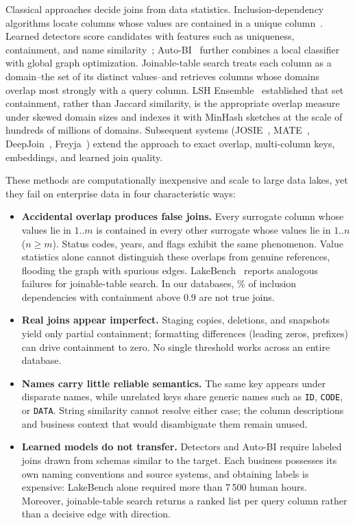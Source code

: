 Classical approaches decide joins from data statistics. Inclusion-dependency algorithms locate columns whose values are contained in a unique column~\cite{Tschirschnitz17}. Learned detectors score candidates with features such as uniqueness, containment, and name similarity~\cite{Rostin09,ZhangHOPS10,HoPF}; Auto-BI~\cite{AutoBI} further combines a local classifier with global graph optimization. Joinable-table search treats each column as a domain--the set of its distinct values--and retrieves columns whose domains overlap most strongly with a query column. LSH Ensemble~\cite{DBLP:journals/pvldb/ZhuNPM16} established that set containment, rather than Jaccard similarity, is the appropriate overlap measure under skewed domain sizes and indexes it with MinHash sketches at the scale of hundreds of millions of domains. Subsequent systems (JOSIE~\cite{DBLP:conf/sigmod/ZhuDNM19}, MATE~\cite{MATE}, DeepJoin~\cite{2023_dong_deepjoin}, Freyja~\cite{Freyja}) extend the approach to exact overlap, multi-column keys, embeddings, and learned join quality.

These methods are computationally inexpensive and scale to large data lakes, yet they fail on enterprise data in four characteristic ways:
\begin{itemize}[leftmargin=*]
\item \textbf{Accidental overlap produces false joins.} Every surrogate column whose values lie in $1..m$ is contained in every other surrogate whose values lie in $1..n$ ($n\geq m$). Status codes, years, and flags exhibit the same phenomenon. Value statistics alone cannot distinguish these overlaps from genuine references, flooding the graph with spurious edges. LakeBench~\cite{LakeBench} reports analogous failures for joinable-table search. In our databases, \% of inclusion dependencies with containment above 0.9 are not true joins.
\item \textbf{Real joins appear imperfect.} Staging copies, deletions, and snapshots yield only partial containment; formatting differences (leading zeros, prefixes) can drive containment to zero. No single threshold works across an entire database.
\item \textbf{Names carry little reliable semantics.} The same key appears under disparate names, while unrelated keys share generic names such as \texttt{ID}, \texttt{CODE}, or \texttt{DATA}. String similarity cannot resolve either case; the column descriptions and business context that would disambiguate them remain unused.
\item \textbf{Learned models do not transfer.} Detectors and Auto-BI require labeled joins drawn from schemas similar to the target. Each business possesses its own naming conventions and source systems, and obtaining labels is expensive: LakeBench alone required more than 7\,500 human hours. Moreover, joinable-table search returns a ranked list per query column rather than a decisive edge with direction.
\end{itemize}


